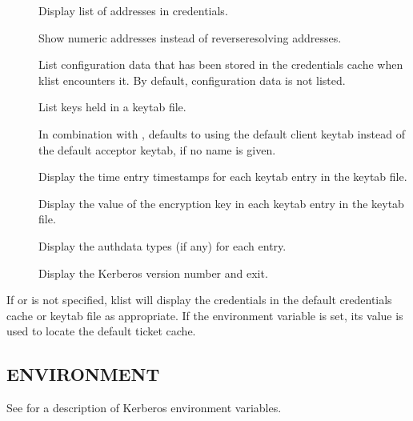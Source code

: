 \documentclass[letterpaper,10pt,english]{sphinxmanual}
\begin{document}
\begin{description}
\item[{}] \leavevmode
\sphinxAtStartPar
Display list of addresses in credentials.

\item[{}] \leavevmode
\sphinxAtStartPar
Show numeric addresses instead of reverse\sphinxhyphen{}resolving addresses.

\item[{}] \leavevmode
\sphinxAtStartPar
List configuration data that has been stored in the credentials
cache when klist encounters it.  By default, configuration data
is not listed.

\item[{}] \leavevmode
\sphinxAtStartPar
List keys held in a keytab file.

\item[{}] \leavevmode
\sphinxAtStartPar
In combination with , defaults to using the default client
keytab instead of the default acceptor keytab, if no name is
given.

\item[{}] \leavevmode
\sphinxAtStartPar
Display the time entry timestamps for each keytab entry in the
keytab file.

\item[{}] \leavevmode
\sphinxAtStartPar
Display the value of the encryption key in each keytab entry in
the keytab file.

\item[{}] \leavevmode
\sphinxAtStartPar
Display the authdata types (if any) for each entry.

\item[{}] \leavevmode
\sphinxAtStartPar
Display the Kerberos version number and exit.

\end{description}

\sphinxAtStartPar
If  or  is not specified, klist will display
the credentials in the default credentials cache or keytab file as
appropriate.  If the  environment variable is set, its
value is used to locate the default ticket cache.


\subsection{ENVIRONMENT}
\label{\detokenize{user/user_commands/klist:environment}}
\sphinxAtStartPar
See {\hyperref[\detokenize{user/user_config/kerberos:kerberos-7}]{}} for a description of Kerberos environment
variables.
\end{document}
